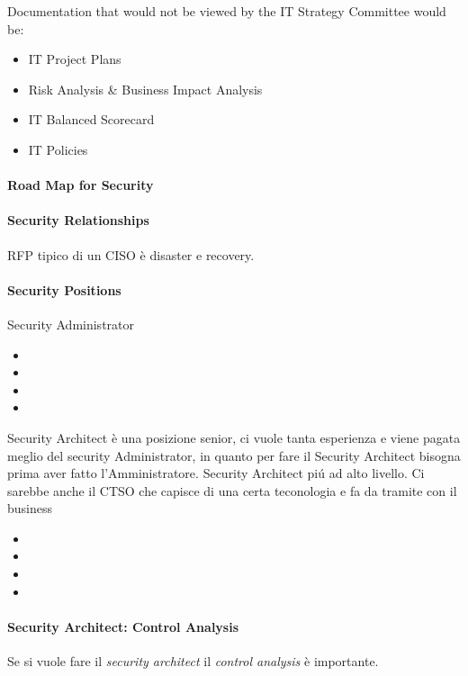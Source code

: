 Documentation that would not be viewed by the IT Strategy Committee would be:
\begin{itemize}
\item IT Project Plans
\item Risk Analysis \& Business Impact Analysis
\item IT Balanced Scorecard
\item IT Policies
\end{itemize}


\paragraph{Road Map for Security}

\paragraph{Security Relationships}


RFP tipico di un CISO è disaster e recovery. 




\paragraph{Security Positions} 
Security Administrator

\begin{itemize}
\item 
\item 
\item
\item 
\end{itemize}
Security Architect è una posizione senior, ci vuole tanta esperienza e viene 
pagata meglio del security Administrator, in quanto per fare il Security 
Architect bisogna prima aver fatto l'Amministratore. 
Security Architect piú ad alto livello. Ci sarebbe anche il CTSO che capisce di 
una certa teconologia e fa da tramite con il business
\begin{itemize}
\item 
\item 
\item
\item 
\end{itemize}
\paragraph{Security Architect: Control Analysis}

Se si vuole fare il \textit{security architect} il \textit{control analysis} è 
importante.

